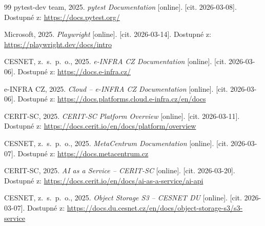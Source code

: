 \documentclass[a4paper, 11pt]{article}
\newcommand{\docurl}[1]{\textcolor{cblue}{\url{#1}}}
\begin{document}
\begin{thebibliography}{99}
 pytest-dev team, 2025. \textit{pytest Documentation} [online]. [cit. 2026-03-08]. Dostupné z: \docurl{https://docs.pytest.org/}

 Microsoft, 2025. \textit{Playwright} [online]. [cit. 2026-03-14]. Dostupné z: \docurl{https://playwright.dev/docs/intro}

 CESNET, z.~s.~p.~o., 2025. \textit{e-INFRA CZ Documentation} [online]. [cit. 2026-03-06]. Dostupné z: \docurl{https://docs.e-infra.cz/}

 e-INFRA CZ, 2025. \textit{Cloud -- e-INFRA CZ Documentation} [online]. [cit. 2026-03-06]. Dostupné z: \docurl{https://docs.platforms.cloud.e-infra.cz/en/docs}

 CERIT-SC, 2025. \textit{CERIT-SC Platform Overview} [online]. [cit. 2026-03-11]. Dostupné z: \docurl{https://docs.cerit.io/en/docs/platform/overview}

 CESNET, z.~s.~p.~o., 2025. \textit{MetaCentrum Documentation} [online]. [cit. 2026-03-07]. Dostupné z: \docurl{https://docs.metacentrum.cz}

 CERIT-SC, 2025. \textit{AI as a Service -- CERIT-SC} [online]. [cit. 2026-03-20]. Dostupné z: \docurl{https://docs.cerit.io/en/docs/ai-as-a-service/ai-api}

 CESNET, z.~s.~p.~o., 2025. \textit{Object Storage S3 -- CESNET DU} [online]. [cit. 2026-03-07]. Dostupné z: \docurl{https://docs.du.cesnet.cz/en/docs/object-storage-s3/s3-service}

\end{thebibliography}
\end{document}
